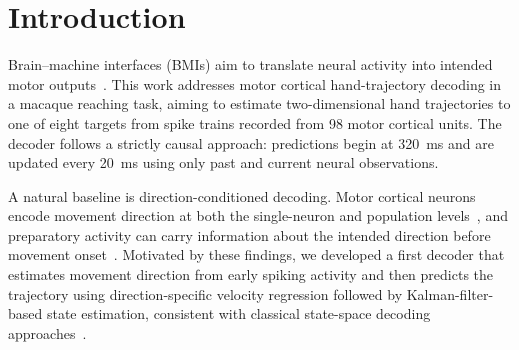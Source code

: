 \section{Introduction}





Brain--machine interfaces (BMIs) aim to translate neural activity into intended motor outputs~\cite{hochberg2012reach}. This work addresses motor cortical hand-trajectory decoding in a macaque reaching task, aiming to estimate two-dimensional hand trajectories to one of eight targets from spike trains recorded from 98 motor cortical units. The decoder follows a strictly causal approach: predictions begin at 320~ms and are updated every 20~ms using only past and current neural observations.

A natural baseline is direction-conditioned decoding. Motor cortical neurons encode movement direction at both the single-neuron and population levels~\cite{georgopoulos1982relations,georgopoulos1986neuronal}, and preparatory activity can carry information about the intended direction before movement onset~\cite{alexander1990preparation}. Motivated by these findings, we developed a first decoder that estimates movement direction from early spiking activity and then predicts the trajectory using direction-specific velocity regression followed by Kalman-filter-based state estimation, consistent with classical state-space decoding approaches~\cite{wu2003neural,gilja2012high}.

